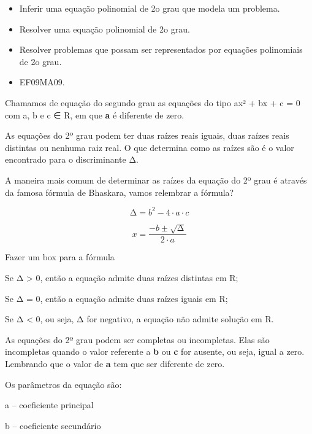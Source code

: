\begin{escolha}
{{{\begin{escolha}
{

\begin{itemize}

  \item Inferir uma equação polinomial de 2o grau que modela um problema.
  \item Resolver uma equação polinomial de 2o grau.
  \item Resolver problemas que possam ser representados por equações
polinomiais de 2o grau.   

\end{itemize} 


\begin{itemize}
  \item EF09MA09.
\end{itemize}



Chamamos de equação do segundo grau as equações do tipo ax² + bx + c = 0
com a, b e c ∈ R, em que \textbf{a} é diferente de zero.

As equações do 2º grau podem ter duas raízes reais iguais, duas raízes
reais distintas ou nenhuma raiz real. O que determina como as raízes são
é o valor encontrado para o discriminante \(\mathrm{\Delta}\).

A maneira mais comum de determinar as raízes da equação do 2º grau é
através da famosa fórmula de Bhaskara, vamos relembrar a fórmula?

\[\mathrm{\Delta} = b^{2} - 4 \cdot a \cdot c\]

\[x = \frac{- b \pm \sqrt{\mathrm{\Delta}}}{2 \cdot a}\]

Fazer um box para a fórmula

Se Δ \textgreater{} 0, então a equação admite duas raízes distintas em
R;

Se Δ = 0, então a equação admite duas raízes iguais em R;

Se Δ \textless{} 0, ou seja, Δ for negativo, a equação não admite
solução em R.

As equações do 2º grau podem ser completas ou incompletas. Elas são
incompletas quando o valor referente a \textbf{b} ou \textbf{c} for
ausente, ou seja, igual a zero. Lembrando que o valor de \textbf{a} tem
que ser diferente de zero.

Os parâmetros da equação são:

a -- coeficiente principal

b -- coeficiente secundário

}
\end{escolha}}}}
\end{escolha}
